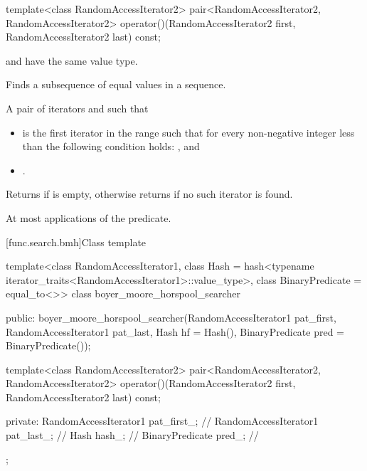 %
\begin{itemdecl}
template<class RandomAccessIterator2>
  pair<RandomAccessIterator2, RandomAccessIterator2>
    operator()(RandomAccessIterator2 first, RandomAccessIterator2 last) const;
\end{itemdecl}

\begin{itemdescr}
\pnum
\mandates
{} and 
have the same value type.

\pnum
\effects
Finds a subsequence of equal values in a sequence.

\pnum
\returns
A pair of iterators  and  such that
\begin{itemize}
\item {} is the first iterator
in the range  such that
for every non-negative integer  less than 
the following condition holds:
, and
\item {}.
\end{itemize}
Returns  if  is empty,
otherwise returns  if no such iterator is found.

\pnum
\complexity
At most  applications of the predicate.
\end{itemdescr}

[func.search.bmh]{Class template }

%
\begin{codeblock}
template<class RandomAccessIterator1,
         class Hash = hash<typename iterator_traits<RandomAccessIterator1>::value_type>,
         class BinaryPredicate = equal_to<>>
  class boyer_moore_horspool_searcher {
  public:
    boyer_moore_horspool_searcher(RandomAccessIterator1 pat_first,
                                  RandomAccessIterator1 pat_last,
                                  Hash hf = Hash(),
                                  BinaryPredicate pred = BinaryPredicate());

    template<class RandomAccessIterator2>
      pair<RandomAccessIterator2, RandomAccessIterator2>
        operator()(RandomAccessIterator2 first, RandomAccessIterator2 last) const;

  private:
    RandomAccessIterator1 pat_first_;   // \expos
    RandomAccessIterator1 pat_last_;    // \expos
    Hash hash_;                         // \expos
    BinaryPredicate pred_;              // \expos
  };
\end{codeblock}

